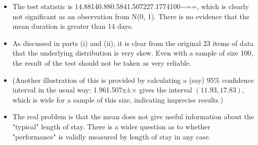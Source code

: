 \documentclass[a4paper,12pt]{article}
\begin{document}
\begin{enumerate}
\begin{itemize}
\item The test statistic is 14.88140.880.5841.507227.1774100−==, which is clearly not significant as an observation from N(0, 1). There is no evidence that the mean duration is greater than 14 days.
\item As discussed in parts (i) and (ii), it is clear from the original 23 items of data that the underlying distribution is very skew. Even with a sample of size 100, the result of the test should not be taken as very reliable. 
\item (Another illustration of this is provided by calculating a (say) 95\% confidence interval in the usual way: 1.961.507x±× gives the interval $(11.93, 17.83)$, which is wide for a sample of this size, indicating imprecise results.) 
\item The real problem is that the mean does not give useful information about the "typical" length of stay. There is a wider question as to whether "performance" is validly measured by length of stay in any case.
\end{itemize}

\end{enumerate}
\end{document}
